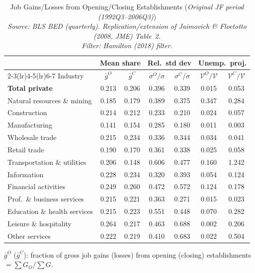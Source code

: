 \begin{table}[htbp]
\centering
\small
\caption{Job Gains/Losses from Opening/Closing Establishments (\emph{Original JF period (1992Q3--2006Q3)}) \\
  \emph{Source: BLS BED (quarterly). Replication/extension of Jaimovich \& Floetotto (2008, JME) Table~2.} \\  \emph{Filter: Hamilton (2018) filter.}}
\label{tab:jf_t2_jf_orig_ham}
\begin{tabular}{lcccccc}
\toprule
 & \multicolumn{2}{c}{Mean share} & \multicolumn{2}{c}{Rel.\ std dev} & \multicolumn{2}{c}{Unemp.\ proj.} \\
\cmidrule(lr){2-3}\cmidrule(lr){4-5}\cmidrule(lr){6-7}
Industry & $\bar{g}^O$ & $\bar{g}^C$ & $\sigma^O/\sigma$ & $\sigma^C/\sigma$ & $\mathcal{V}^O/\mathcal{V}$ & $\mathcal{V}^C/\mathcal{V}$ \\
\midrule
\midrule
\textbf{Total private} & 0.213 & 0.206 & 0.396 & 0.339 & 0.015 & 0.053 \\
Natural resources \& mining & 0.185 & 0.179 & 0.389 & 0.375 & 0.347 & 0.284 \\
Construction & 0.214 & 0.212 & 0.233 & 0.210 & 0.024 & 0.057 \\
Manufacturing & 0.141 & 0.154 & 0.285 & 0.180 & 0.011 & 0.003 \\
Wholesale trade & 0.215 & 0.234 & 0.336 & 0.344 & 0.034 & 0.041 \\
Retail trade & 0.190 & 0.170 & 0.361 & 0.338 & 0.025 & 0.058 \\
Transportation \& utilities & 0.206 & 0.148 & 0.606 & 0.477 & 0.160 & 1.242 \\
Information & 0.228 & 0.234 & 0.320 & 0.393 & 0.054 & 0.124 \\
Financial activities & 0.249 & 0.260 & 0.472 & 0.572 & 0.124 & 0.178 \\
Prof.~\& business services & 0.215 & 0.221 & 0.363 & 0.271 & 0.015 & 0.023 \\
Education \& health services & 0.215 & 0.223 & 0.551 & 0.448 & 0.070 & 0.282 \\
Leisure \& hospitality & 0.264 & 0.217 & 0.463 & 0.688 & 0.002 & 0.206 \\
Other services & 0.222 & 0.219 & 0.410 & 0.683 & 0.022 & 0.504 \\
\bottomrule
\end{tabular}
\begin{tablenotes}[flushleft]\footnotesize
\item $\bar{g}^O$ ($\bar{g}^C$): fraction of gross job gains (losses) from opening (closing) establishments $= \sum G_O / \sum G$.

\end{tablenotes}
\end{table}
